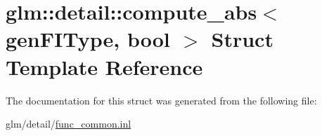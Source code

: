 \hypertarget{structglm_1_1detail_1_1compute__abs}{\section{glm\-:\-:detail\-:\-:compute\-\_\-abs$<$ gen\-F\-I\-Type, bool $>$ Struct Template Reference}
\label{structglm_1_1detail_1_1compute__abs}
}


The documentation for this struct was generated from the following file\-:\begin{DoxyCompactItemize}
\item 
glm/detail/\hyperlink{func__common_8inl}{func\-\_\-common.\-inl}\end{DoxyCompactItemize}
